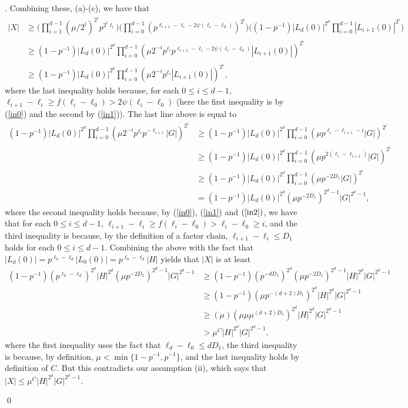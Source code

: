 \documentclass[12pt,oneside,british,a4wide]{amsart}
\numberwithin{equation}{section}
\theoremstyle{definition}
\newenvironment{proofof}[1]{\indent{\itshape Proof of #1}.\;}{\qed}
\begin{document}
\begin{proofof}{Theorem \ref{thm:almoststableinhstrong}}
Combining these, (a)-(c), we have that 
\begin{align*}
|X|&\geq \Big(\prod_{i=1}^{d-1}(\mu/2^i)^{2^i} p^{2^i \ell_i}\Big)\Big(\prod_{i=0}^{d-1}( p^{\ell_{i+1}-\ell_i-2\psi(\ell_i-\ell_0)})^{2^i}\Big)\Big((1-p^{-1})|L_d(0)|^{2^d} \prod_{i=0}^{d-1}|L_{i+1}(0)|^{2^{i}}\Big)\\
&\geq (1-p^{-1})|L_d(0)|^{2^d}\prod_{i=0}^{d-1}(\mu 2^{-i}p^{\ell_i} p^{\ell_{i+1}-\ell_i-2\psi(\ell_i-\ell_0)}|L_{i+1}(0)|)^{2^{i}}\\
&\geq (1-p^{-1})|L_d(0)|^{2^d}\prod_{i=0}^{d-1}(\mu 2^{-i} p^{\ell_i}|L_{i+1}(0)|)^{2^{i}},
\end{align*}
where the last inequality holds because, for each $0\leq i\leq d-1$, $\ell_{i+1}-\ell_i\geq f(\ell_i-\ell_0)>2\psi(\ell_i-\ell_0)$ (here the first inequality is by (\ref{in0}) and the second by (\ref{in1})).  The last line above is equal to 
\begin{align*}
(1-p^{-1})|L_d(0)|^{2^d}\prod_{i=0}^{d-1}( \mu 2^{-i} p^{\ell_i}p^{-\ell_{i+1}}|G|)^{2^{i}}&\geq (1-p^{-1})|L_d(0)|^{2^d}\prod_{i=0}^{d-1}( \mu  p^{\ell_i-\ell_{i+1}-i}|G|)^{2^{i}}\\
&\geq (1-p^{-1})|L_d(0)|^{2^d}\prod_{i=0}^{d-1}( \mu  p^{2(\ell_i-\ell_{i+1})}|G|)^{2^{i}}\\
&\geq (1-p^{-1})|L_d(0)|^{2^d}\prod_{i=0}^{d-1}( \mu p^{-2D_1}|G|)^{2^{i}}\\
&= (1-p^{-1})|L_d(0)|^{2^d}(\mu p^{-2D_1})^{2^d-1}|G|^{2^d-1},
\end{align*}
where the second inequality holds because, by (\ref{in0}), (\ref{in1}) and $(\ref{in2})$, we have that for each $0\leq i\leq d-1$, $\ell_{i+1}-\ell_i \geq f(\ell_i-\ell_0)>\ell_i-\ell_0\geq i$, and the third inequality  is because, by the definition of a factor chain, $\ell_{i+1}-\ell_i\leq D_1$ holds for each $0\leq i\leq d-1$.  Combining the above with the fact that $|L_d(0)|=p^{\ell_0-\ell_d}|L_0(0)|=p^{\ell_0-\ell_d}|H|$ yields that $|X|$ is at least
\begin{align*}
(1-p^{-1})(p^{\ell_0-\ell_d})^{2^d}|H|^{2^d}(\mu  p^{-2D_1})^{2^d-1} |G|^{2^d-1}&\geq (1-p^{-1})(p^{-dD_1})^{2^d}(\mu   p^{-2D_1})^{2^d-1}|H|^{2^d} |G|^{2^d-1}\\
&\geq (1-p^{-1})(\mu  p^{-(d+2)D_1})^{2^d}|H|^{2^d}|G|^{2^d-1}\\
&\geq (\mu)(\mu \mu  \mu ^{(d+2)D_1})^{2^d}|H|^{2^d}|G|^{2^d-1}\\
&>\mu^C|H|^{2^d}|G|^{2^d-1},
\end{align*}
where the first inequality uses the fact that $\ell_d-\ell_0\leq dD_1$, the third inequality is because, by definition, $\mu<\min\{1-p^{-1}, p^{-1}\}$, and the last inequality holds by definition of $C$.  But this contradicts our assumption (ii), which says that $|X|\leq \mu^C|H|^{2^d}|G|^{2^d-1}$.



\end{proofof}
\end{document}
